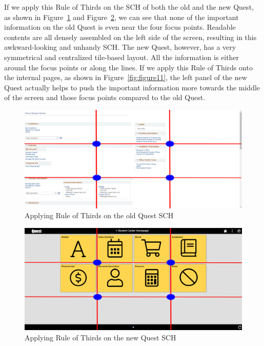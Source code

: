 \documentclass[conference]{IEEEtran}
\begin{document}
If we apply this Rule of Thirds on the SCH of both the old and the new Quest, as shown in Figure~\ref{fig:figure9} and Figure~\ref{fig:figure10}, we can see that none of the important information on the old Quest is even near the four focus points. Readable contents are all densely assembled on the left side of the screen, resulting in this awkward-looking and unhandy SCH. The new Quest, however, has a very symmetrical and centralized tile-based layout. All the information is either around the focus points or along the lines. If we apply this Rule of Thirds onto the internal pages, as shown in Figure~\ref{fig:figure11}, the left panel of the new Quest actually helps to push the important information more towards the middle of the screen and those focus points compared to the old Quest. 

\begin{figure}[htdp]
\centering
  \includegraphics[width=1\columnwidth]{Old_student_center_homepage_full_grid.png}
  \caption{Applying Rule of Thirds on the old Quest SCH}
  \label{fig:figure9}
\end{figure}
\begin{figure}[htdp]
\centering
  \includegraphics[width=1\columnwidth]{Grid_Student_Center_Homepage.png}
  \caption{Applying Rule of Thirds on the new Quest SCH}
  \label{fig:figure10}
\end{figure}
\end{document}
